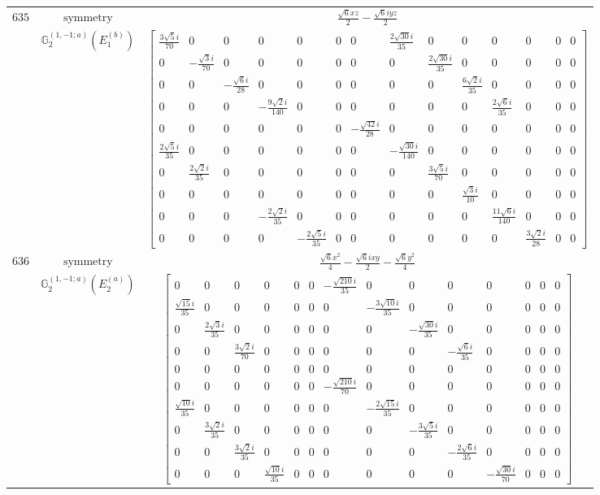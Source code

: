 \documentclass[fleqn,8pt,landscape]{jsarticle}
\begin{document}
\begin{longtable}{ccc}
$ 635 $ & $ \text{symmetry} $ & $ \frac{\sqrt{6} x z}{2} - \frac{\sqrt{6} i y z}{2} $ \\
$  $ & $ \mathbb{G}_{2}^{(1,-1;a)}(E_{1}^{(b)}) $ & $ \begin{bmatrix} \frac{3 \sqrt{5} i}{70} & 0 & 0 & 0 & 0 & 0 & 0 & \frac{2 \sqrt{30} i}{35} & 0 & 0 & 0 & 0 & 0 & 0 \\ 0 & - \frac{\sqrt{3} i}{70} & 0 & 0 & 0 & 0 & 0 & 0 & \frac{2 \sqrt{30} i}{35} & 0 & 0 & 0 & 0 & 0 \\ 0 & 0 & - \frac{\sqrt{6} i}{28} & 0 & 0 & 0 & 0 & 0 & 0 & \frac{6 \sqrt{2} i}{35} & 0 & 0 & 0 & 0 \\ 0 & 0 & 0 & - \frac{9 \sqrt{2} i}{140} & 0 & 0 & 0 & 0 & 0 & 0 & \frac{2 \sqrt{6} i}{35} & 0 & 0 & 0 \\ 0 & 0 & 0 & 0 & 0 & 0 & - \frac{\sqrt{42} i}{28} & 0 & 0 & 0 & 0 & 0 & 0 & 0 \\ \frac{2 \sqrt{5} i}{35} & 0 & 0 & 0 & 0 & 0 & 0 & - \frac{\sqrt{30} i}{140} & 0 & 0 & 0 & 0 & 0 & 0 \\ 0 & \frac{2 \sqrt{2} i}{35} & 0 & 0 & 0 & 0 & 0 & 0 & \frac{3 \sqrt{5} i}{70} & 0 & 0 & 0 & 0 & 0 \\ 0 & 0 & 0 & 0 & 0 & 0 & 0 & 0 & 0 & \frac{\sqrt{3} i}{10} & 0 & 0 & 0 & 0 \\ 0 & 0 & 0 & - \frac{2 \sqrt{2} i}{35} & 0 & 0 & 0 & 0 & 0 & 0 & \frac{11 \sqrt{6} i}{140} & 0 & 0 & 0 \\ 0 & 0 & 0 & 0 & - \frac{2 \sqrt{5} i}{35} & 0 & 0 & 0 & 0 & 0 & 0 & \frac{3 \sqrt{2} i}{28} & 0 & 0 \end{bmatrix} $ \\ \hline
$ 636 $ & $ \text{symmetry} $ & $ \frac{\sqrt{6} x^{2}}{4} - \frac{\sqrt{6} i x y}{2} - \frac{\sqrt{6} y^{2}}{4} $ \\
$  $ & $ \mathbb{G}_{2}^{(1,-1;a)}(E_{2}^{(a)}) $ & $ \begin{bmatrix} 0 & 0 & 0 & 0 & 0 & 0 & - \frac{\sqrt{210} i}{35} & 0 & 0 & 0 & 0 & 0 & 0 & 0 \\ \frac{\sqrt{15} i}{35} & 0 & 0 & 0 & 0 & 0 & 0 & - \frac{3 \sqrt{10} i}{35} & 0 & 0 & 0 & 0 & 0 & 0 \\ 0 & \frac{2 \sqrt{3} i}{35} & 0 & 0 & 0 & 0 & 0 & 0 & - \frac{\sqrt{30} i}{35} & 0 & 0 & 0 & 0 & 0 \\ 0 & 0 & \frac{3 \sqrt{2} i}{70} & 0 & 0 & 0 & 0 & 0 & 0 & - \frac{\sqrt{6} i}{35} & 0 & 0 & 0 & 0 \\ 0 & 0 & 0 & 0 & 0 & 0 & 0 & 0 & 0 & 0 & 0 & 0 & 0 & 0 \\ 0 & 0 & 0 & 0 & 0 & 0 & - \frac{\sqrt{210} i}{70} & 0 & 0 & 0 & 0 & 0 & 0 & 0 \\ \frac{\sqrt{10} i}{35} & 0 & 0 & 0 & 0 & 0 & 0 & - \frac{2 \sqrt{15} i}{35} & 0 & 0 & 0 & 0 & 0 & 0 \\ 0 & \frac{3 \sqrt{2} i}{35} & 0 & 0 & 0 & 0 & 0 & 0 & - \frac{3 \sqrt{5} i}{35} & 0 & 0 & 0 & 0 & 0 \\ 0 & 0 & \frac{3 \sqrt{2} i}{35} & 0 & 0 & 0 & 0 & 0 & 0 & - \frac{2 \sqrt{6} i}{35} & 0 & 0 & 0 & 0 \\ 0 & 0 & 0 & \frac{\sqrt{10} i}{35} & 0 & 0 & 0 & 0 & 0 & 0 & - \frac{\sqrt{30} i}{70} & 0 & 0 & 0 \end{bmatrix} $ \\ \hline

\end{longtable}
\end{document}
